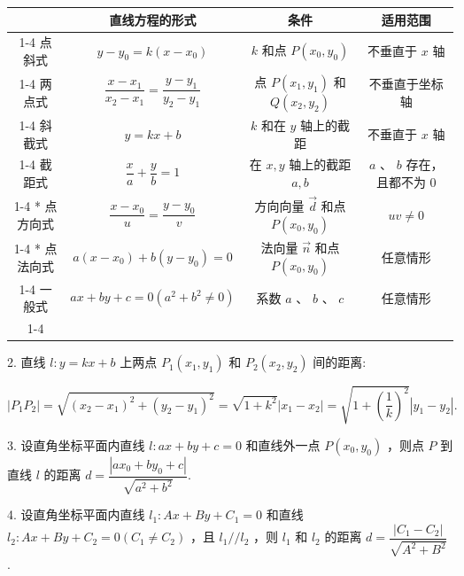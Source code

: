 \begin{center}
\begin{tabular}{|c|c|c|c|}
\hline
\phantom{X} & 直线方程的形式 & 条件 & 适用范围 \\
\cline{1-4}
点斜式 & $y - {y}_{0} = k\left( {x - {x}_{0}}\right)$ & $k$ 和点 $P\left( {{x}_{0},{y}_{0}}\right)$ & 不垂直于 $x$ 轴 \\
\cline{1-4}
两点式 & $\dfrac{x - {x}_{1}}{{x}_{2} - {x}_{1}} = \dfrac{y - {y}_{1}}{{y}_{2} - {y}_{1}}$ & 点 $P\left( {{x}_{1},{y}_{1}}\right)$ 和 $Q\left( {{x}_{2},{y}_{2}}\right)$ & 不垂直于坐标轴 \\
\cline{1-4}
斜截式 & $y = {kx} + b$ & $k$ 和在 $y$ 轴上的截距 & 不垂直于 $x$ 轴 \\
\cline{1-4}
截距式 & $\dfrac{x}{a} + \dfrac{y}{b} = 1$ & 在 $x,y$ 轴上的截距 $a,b$ & $a$ 、 $b$ 存在，且都不为 0 \\
\cline{1-4}
* 点方向式 & $\dfrac{x - {x}_{0}}{u} = \dfrac{y - {y}_{0}}{v}$ & 方向向量 $\overrightarrow{d}$ 和点 $P\left( {{x}_{0},{y}_{0}}\right)$ & ${uv} \neq  0$ \\
\cline{1-4}
* 点法向式 & $a\left( {x - {x}_{0}}\right)  + b\left( {y - {y}_{0}}\right)  = 0$ & 法向量 $\overrightarrow{n}$ 和点 $P\left( {{x}_{0},{y}_{0}}\right)$ & 任意情形 \\
\cline{1-4}
一般式 & ${ax} + {by} + c = 0\left( {{a}^{2} + {b}^{2} \neq  0}\right)$ & 系数 $a$ 、 $b$ 、 $c$ & 任意情形 \\
\cline{1-4}
\hline
\end{tabular}
\end{center}

2. 直线 $l : y = {kx} + b$ 上两点 ${P}_{1}\left( {{x}_{1},{y}_{1}}\right)$ 和 ${P}_{2}\left( {{x}_{2},{y}_{2}}\right)$ 间的距离:

$\left| {{P}_{1}{P}_{2}}\right|  = \sqrt{{\left( {x}_{2} - {x}_{1}\right) }^{2} + {\left( {y}_{2} - {y}_{1}\right) }^{2}} = \sqrt{1 + {k}^{2}}\left| {{x}_{1} - {x}_{2}}\right|  = \sqrt{1 + {\left( \dfrac{1}{k}\right) }^{2}}\left| {{y}_{1} - {y}_{2}}\right| .$

3. 设直角坐标平面内直线 $l : {ax} + {by} + c = 0$ 和直线外一点 $P\left( {{x}_{0},{y}_{0}}\right)$ ，则点 $P$ 到直线 $l$ 的距离 $d = \dfrac{\left| a{x}_{0} + b{y}_{0} + c\right| }{\sqrt{{a}^{2} + {b}^{2}}}.$

4. 设直角坐标平面内直线 ${l}_{1} : {Ax} + {By} + {C}_{1} = 0$ 和直线 ${l}_{2} : {Ax} + {By} + {C}_{2} = 0\left( {{C}_{1} \neq  {C}_{2}}\right)$ ，且 ${l}_{1}//{l}_{2}$ ，则 ${l}_{1}$ 和 ${l}_{2}$ 的距离 $d = \dfrac{\left| {C}_{1} - {C}_{2}\right| }{\sqrt{{A}^{2} + {B}^{2}}}$ .

